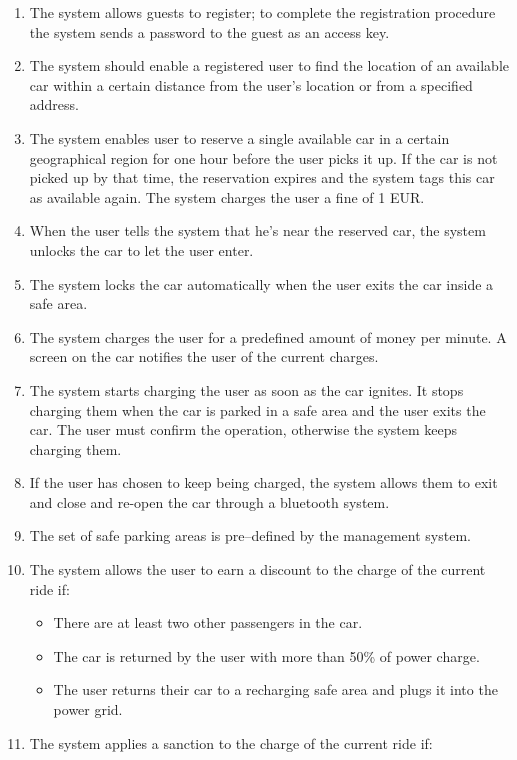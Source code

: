 			\begin{enumerate}
				\item The system allows guests to register; to complete the registration procedure the system sends a password to the guest as an access key.
				\item The system should enable a registered user to find the location of an available car within a certain distance from the user's location or from a specified address.
				\item The system enables user to reserve a single available car in a certain geographical region for one hour before the user picks it up. If the car is not picked up by that time, the reservation expires and the system tags this car as available again. The system charges the user a fine of 1 EUR.
				\item When the user tells the system that he's near the reserved car, the system unlocks the car to let the user enter.  
				\item The system locks the car automatically when the user exits the car inside a safe area.  
				\item The system charges the user for a predefined amount of money per minute. A screen on the car notifies the user of the current charges.
				\item The system starts charging the user as soon as the car ignites. It stops charging them when the car is parked in a safe area and the user exits the car. The user must confirm the operation, otherwise the system keeps charging them. 
				\item If the user has chosen to keep being charged, the system allows them to exit and close and re-open the car through a bluetooth system.
				\item The set of safe parking areas is pre–defined by the management system.
				\item The system allows the user to earn a discount to the charge of the current ride if:
					\begin{itemize}
						\item There are at least two other passengers in the car.
						\item The car is returned by the user with more than 50\% of power charge.
						\item The user returns their car to a recharging safe area and plugs it into the power grid.
					\end{itemize}
				\item The system applies a sanction to the charge of the current ride if:

\end{enumerate}
